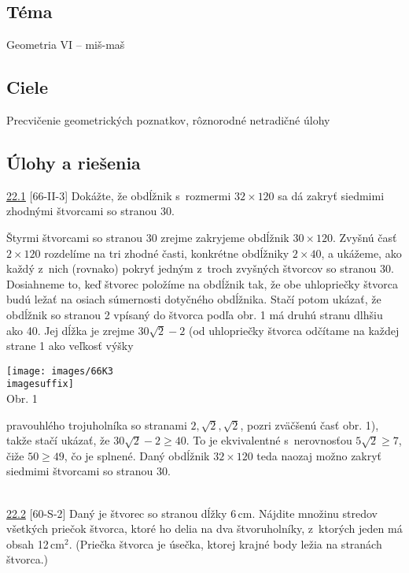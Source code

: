 

\subsection*{Téma}
Geometria VI -- miš-maš
\subsection*{Ciele}
Precvičenie geometrických poznatkov, rôznorodné netradičné úlohy

\subsection*{Úlohy a riešenia}
\begin{tcolorbox}[breakable,notitle,boxrule=0pt,colback=light-gray,colframe=light-gray]\ul{22.1} [66-II-3] Dokážte, že obdĺžnik s~rozmermi $32 \times 120$ sa dá zakryť siedmimi zhodnými štvorcami so stranou 30.

\end{tcolorbox}

\rieh Štyrmi štvorcami so stranou 30 zrejme zakryjeme obdĺžnik $30\times 120$. Zvyšnú časť $2 \times 120$ rozdelíme na tri zhodné časti, konkrétne obdĺžniky $2 \times 40$, a ukážeme, ako každý z~nich (rovnako) pokryť jedným z~troch zvyšných štvorcov so stranou 30. Dosiahneme to, keď štvorec položíme na obdĺžnik tak, že obe uhlopriečky štvorca budú ležať na osiach súmernosti dotyčného obdĺžnika. Stačí potom ukázať, že obdĺžnik so stranou 2 vpísaný do štvorca podľa obr. 1 má druhú stranu dlhšiu ako 40. Jej dĺžka je zrejme $30\sqrt{2}-2$ (od uhlopriečky štvorca odčítame na každej strane 1 ako veľkosť výšky
\begin{center}
\texttt{[image: images/66K3\\imagesuffix]} \\

Obr. 1
\end{center}
pravouhlého trojuholníka so stranami $2, \sqrt{2}, \sqrt{2}$, pozri zväčšenú časť obr. 1), takže stačí ukázať, že $30\sqrt{2}-2\geq 40$. To je ekvivalentné s~nerovnosťou $5\sqrt{2}\geq 7$, čiže $50 \geq 49$, čo je splnené. Daný obdĺžnik $32 \times 120$ teda naozaj možno zakryť siedmimi štvorcami so stranou 30.\\
\\
\begin{tcolorbox}[breakable,notitle,boxrule=0pt,colback=light-gray,colframe=light-gray]\ul{22.2} [60-S-2]  Daný je štvorec so stranou dĺžky 6\,cm. Nájdite množinu stredov všetkých priečok štvorca, ktoré ho delia na dva štvoruholníky, z~ktorých jeden má obsah 12\,cm$^2$. (Priečka štvorca je úsečka, ktorej krajné body ležia na stranách štvorca.)

\end{tcolorbox}

